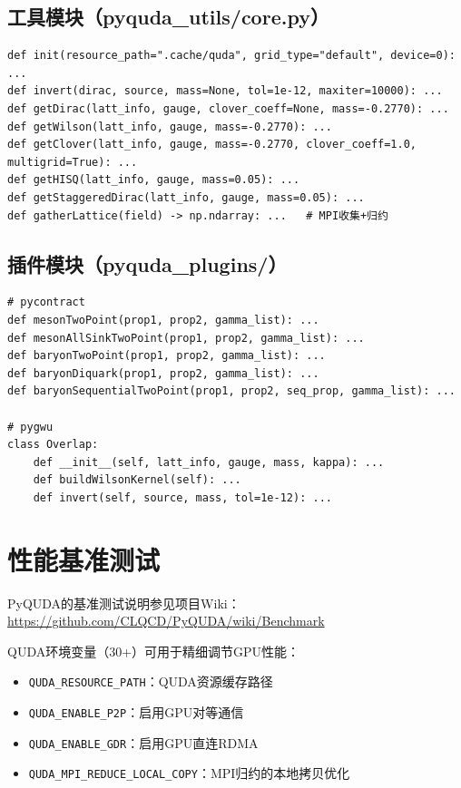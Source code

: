 \documentclass[12pt,a4paper]{ctexart}
\begin{document}
\subsection{工具模块（pyquda\_utils/core.py）}

\begin{lstlisting}[caption={core.py 便捷函数}]
def init(resource_path=".cache/quda", grid_type="default", device=0): ...
def invert(dirac, source, mass=None, tol=1e-12, maxiter=10000): ...
def getDirac(latt_info, gauge, clover_coeff=None, mass=-0.2770): ...
def getWilson(latt_info, gauge, mass=-0.2770): ...
def getClover(latt_info, gauge, mass=-0.2770, clover_coeff=1.0, multigrid=True): ...
def getHISQ(latt_info, gauge, mass=0.05): ...
def getStaggeredDirac(latt_info, gauge, mass=0.05): ...
def gatherLattice(field) -> np.ndarray: ...   # MPI收集+归约
\end{lstlisting}

\subsection{插件模块（pyquda\_plugins/）}

\begin{lstlisting}[caption={插件接口}]
# pycontract
def mesonTwoPoint(prop1, prop2, gamma_list): ...
def mesonAllSinkTwoPoint(prop1, prop2, gamma_list): ...
def baryonTwoPoint(prop1, prop2, gamma_list): ...
def baryonDiquark(prop1, prop2, gamma_list): ...
def baryonSequentialTwoPoint(prop1, prop2, seq_prop, gamma_list): ...

# pygwu
class Overlap:
    def __init__(self, latt_info, gauge, mass, kappa): ...
    def buildWilsonKernel(self): ...
    def invert(self, source, mass, tol=1e-12): ...
\end{lstlisting}

\section{性能基准测试}

PyQUDA的基准测试说明参见项目Wiki：
\url{https://github.com/CLQCD/PyQUDA/wiki/Benchmark}

QUDA环境变量（30+）可用于精细调节GPU性能：
\begin{itemize}[leftmargin=*]
    \item \texttt{QUDA\_RESOURCE\_PATH}：QUDA资源缓存路径
    \item \texttt{QUDA\_ENABLE\_P2P}：启用GPU对等通信
    \item \texttt{QUDA\_ENABLE\_GDR}：启用GPU直连RDMA
    \item \texttt{QUDA\_MPI\_REDUCE\_LOCAL\_COPY}：MPI归约的本地拷贝优化
\end{itemize}
\end{document}

